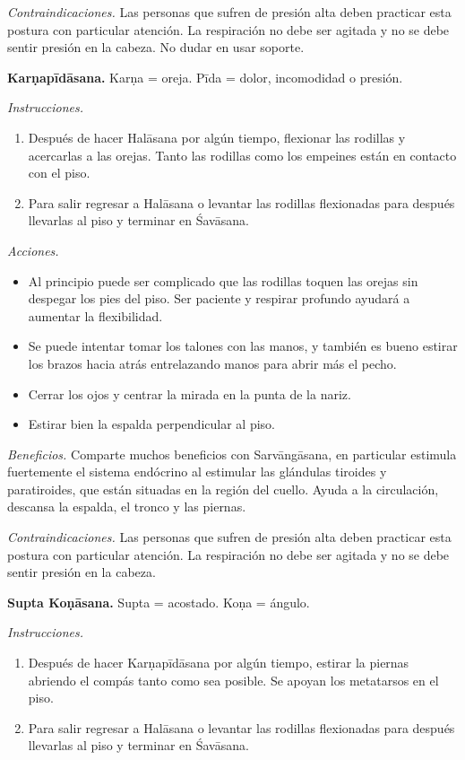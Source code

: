 \emph{Contraindicaciones.} Las personas que
sufren de presión alta deben practicar esta
postura con particular atención. La
respiración no debe ser agitada y no se debe
sentir presión en la cabeza. No dudar en usar
soporte.

\medskip\noindent\textbf{Karṇapīdāsana.}
Karṇa = oreja. Pīda = dolor, incomodidad o
presión.

\emph{Instrucciones.}
\begin{enumerate}
\item Después de hacer Halāsana por algún
tiempo, flexionar las rodillas y acercarlas a
las orejas. Tanto las rodillas como los
empeines están en contacto con el piso.
\item Para salir regresar a Halāsana o
levantar las rodillas flexionadas para
después llevarlas al piso y terminar en
Śavāsana.
\end{enumerate}

\emph{Acciones.}
\begin{itemize}
\item Al principio puede ser complicado que
las rodillas toquen las orejas sin despegar
los pies del piso. Ser paciente y respirar
profundo ayudará a aumentar la flexibilidad.
\item Se puede intentar tomar los talones con
las manos, y también es bueno estirar los
brazos hacia atrás entrelazando manos para
abrir más el pecho.
\item Cerrar los ojos y centrar la mirada en
la punta de la nariz.
\item Estirar bien la espalda perpendicular
al piso.
\end{itemize}

\emph{Beneficios.} Comparte muchos beneficios
con Sarvāngāsana, en particular estimula
fuertemente el sistema endócrino al estimular
las glándulas tiroides y paratiroides, que
están situadas en la región del cuello. Ayuda
a la circulación, descansa la espalda, el
tronco y las piernas.

\emph{Contraindicaciones.} Las personas que
sufren de presión alta deben practicar esta
postura con particular atención. La
respiración no debe ser agitada y no se debe
sentir presión en la cabeza.

\medskip\noindent\textbf{Supta Koṇāsana.}
Supta = acostado. Koṇa = ángulo.

\emph{Instrucciones.}
\begin{enumerate}
\item Después de hacer Karṇapīdāsana por
algún tiempo, estirar la piernas abriendo el
compás tanto como sea posible. Se apoyan los
metatarsos en el piso.
\item Para salir regresar a Halāsana o
levantar las rodillas flexionadas para
después llevarlas al piso y terminar en
Śavāsana.
\end{enumerate}

